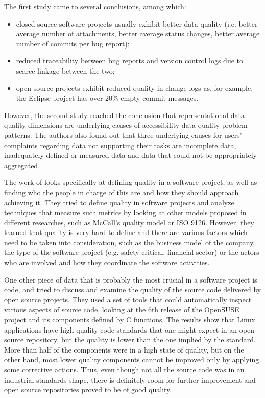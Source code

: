 \documentclass{mprop}
\begin{document}
The first study came to several conclusions, among which:
  \begin{itemize}
    \item closed source software projects usually exhibit better data quality 
    (i.e. better average number of attachments, better average status changes, 
    better average number of commits per bug report);
    \item reduced traceability between bug reports and version control logs
    due to scarce linkage between the two;
    \item open source projects exhibit reduced quality in change logs as,
    for example, the Eclipse project has over 20\% empty commit messages.
  \end{itemize}

However, the second study reached the conclusion that representational data 
quality dimensions are underlying causes of accessibility data quality problem
patterns. The authors also found out that three underlying causes for users'
complaints regarding data not supporting their tasks are incomplete data, 
inadequately defined or measured data and data that could not be appropriately
aggregated.

The work of \citet{kitchenham1996software} looks specifically at defining
quality in a software project, as well as finding who the people in charge of this 
are and how they should approach achieving it. They tried to define quality 
in software projects and analyze techniques that measure such metrics by looking
at other models proposed in different researches, such as McCall's quality
model or ISO 9126. However, they learned that quality is very hard to define and
there are various factors which need to be taken into consideration, such as the
business model of the company, the type of the software project (e.g. safety 
critical, financial sector) or the actors who are involved and how they coordinate
the software activities.

One other piece of data that is probably the most crucial in a software project
is code, and \citet{stamelos2002code} tried to discuss and examine the quality
of the source code delivered by open source projects. They used a set of tools
that could automatically inspect various aspects of source code, looking at
the 6th release of the OpenSUSE project and its components defined by C
functions. The results show that Linux applications have high quality 
code standards that one might expect in an open source repository, but 
the quality is lower than the one implied by the standard. More than half
of the components were in a high state of quality, but on the other hand, 
most lower quality components cannot be improved only by applying some
corrective actions. Thus, even though not all the source code was in 
an industrial standards shape, there is definitely room for further 
improvement and open source repositories proved to be of good quality.
\end{document}

